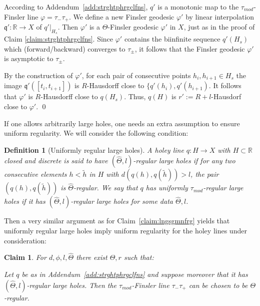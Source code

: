 \documentclass[12pt]{article}
\theoremstyle{boldplain}
\newtheorem{claim}[equation]{Claim}
\theoremstyle{bolddefinition}
\newtheorem{dfn}[equation]{Definition}
\numberwithin{equation}{section}
\def\R{{\mathbb R}}
\def\taumod{\tau_{mod}}
\begin{document}
According to Addendum~\ref{add:strghtphrgclfns}, $q'$ is a monotonic map to the $\taumod$-Finsler line $\varphi=\tau_-\tau_+$. We define a new Finsler geodesic $\varphi'$ by linear interpolation ${\mathfrak q}': \R\to X$ of  $q'|_{H_s}$. Then $\varphi'$ is a $\Theta$-Finsler geodesic $\varphi'$ in $X$, just as in the proof of Claim \ref{claim:strghtphrgclfns}. Since $\varphi'$ contains the biinfinite sequence $q'(H_s)$ which (forward/backward) converges to $\tau_\pm$, it follows that the Finsler geodesic $\varphi'$ is asymptotic to $\tau_\pm$. 

By the construction of $\varphi'$, for each pair of consecutive points $h_i, h_{i+1}\in H_s$ the image 
${\mathfrak q}'([t_i, t_{i+1}])$ is $R$-Hausdorff close to $\{q'(h_i), q'(h_{i+1})$. It follows that 
$\varphi'$ is $R$-Hausdorff close to $q(H_s)$. Thus, $q(H)$ is $r':=R+l$-Hausdorf close to $\varphi'$. 
\qed

\medskip
If one allows arbitrarily large holes,
one needs an extra assumption to ensure uniform regularity.
We will consider the following condition:
\begin{dfn}[Uniformly regular large holes]
\label{dfn:nfrglhls}
A holey line $q:H\to X$ with $H\subset\R$ closed and discrete 
is said to have {\em $(\hat\Theta,l)$-regular large holes}
if for any two consecutive elements $h<\tilde h$ in $H$ with $d(q(h),q(\tilde h))>l$,
the pair $(q(h),q(\tilde h))$ is $\hat\Theta$-regular.
We say that $q$ has {\em uniformly $\taumod$-regular large holes}
if it has $(\hat\Theta,l)$-regular large holes for some data $\hat\Theta,l$.
\end{dfn}

Then a very similar argument as for Claim~\ref{claim:lngsgmnfrg} yields
that uniformly regular large holes imply uniform regularity 
for the holey lines under consideration:

\begin{claim}
\label{claim:lngsgmnbgh}
For $d,\phi,l,\hat\Theta$ there exist $\Theta,r$ such that:

Let $q$ be as in Addendum~\ref{add:strghtphrgclfns}
and suppose moreover that it has $(\hat\Theta,l)$-regular large holes.
Then the $\taumod$-Finsler line $\tau_-\tau_+$ can be chosen to be $\Theta$-regular.
\end{claim}
\end{document}
